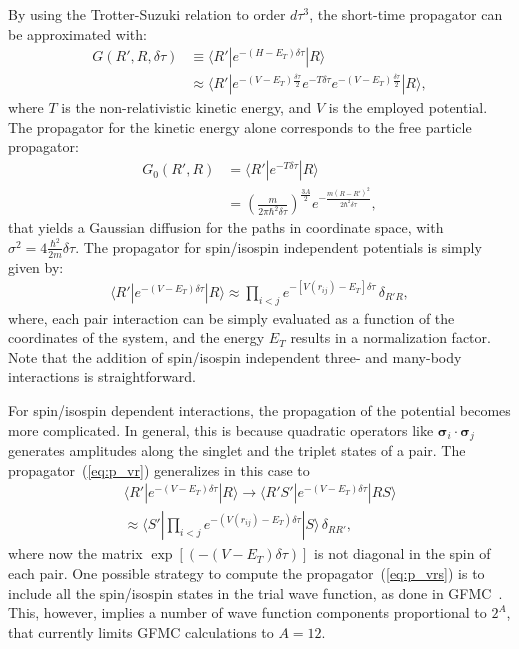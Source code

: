 \documentclass[aps,prc,twocolumn,superscriptaddress,floatfix]{revtex4-1}
\begin{document}
By using the Trotter-Suzuki relation to order $d\tau^3$,
the short-time propagator can be approximated with:
\begin{align}
G(R',R,\delta\tau)&\equiv\langle R'|e^{-(H-E_T)\delta\tau}|R\rangle \nonumber \\
&\approx \langle R'|e^{-(V-E_T)\frac{\delta\tau}{2}}e^{-T\delta\tau}e^{-(V-E_T)\frac{\delta\tau}{2}}
|R\rangle ,
\end{align}
where $T$ is the non-relativistic kinetic energy, and $V$ is the employed potential.
The propagator for the kinetic energy alone corresponds to the free particle propagator:
\begin{align} 
G_0(R',R)&=\langle R'|e^{-T\delta\tau}|R\rangle\nonumber \\
&=\left(\frac{m}{2\pi\hbar^2\delta\tau}\right)^{\frac{3A}{2}}e^{-\frac{m(R-R')^2}{2\hbar^2\delta\tau}} ,
\label{eq:g0}
\end{align}
that yields a Gaussian diffusion for the paths in coordinate space, with
$\sigma^2 = 4 \frac{\hbar^2}{2m} \delta\tau$.
The propagator for spin/isospin independent potentials is simply given by: 
\begin{align}
\langle R'|e^{-(V-E_T)\delta\tau}|R\rangle \approx
\prod_{i<j}e^{-[V(r_{ij})-E_T]\delta\tau}\,\delta_{R'R} ,
\label{eq:p_vr}
\end{align}
where, each pair interaction can be simply evaluated as a function of the coordinates of the 
system, and the energy $E_T$ results in a normalization factor. 
Note that the addition of spin/isospin independent three- and many-body interactions
is straightforward.

For spin/isospin dependent interactions, the propagation of the potential becomes more complicated.
In general, this is because quadratic operators like $\bm\sigma_i\cdot\bm\sigma_j$
generates amplitudes along the singlet and the triplet states of a pair. 
The propagator~(\ref{eq:p_vr}) generalizes in this case to
\begin{align}
\langle R'|e^{-(V-E_T)\delta\tau}|R\rangle  \rightarrow
\langle R'S'|e^{-(V-E_T)\delta\tau}|RS\rangle \nonumber \\
 \approx \langle S'|\prod_{i<j}e^{-(V(r_{ij})-E_T)\delta\tau}|S\rangle\,\delta_{RR'} ,
\label{eq:p_vrs}
\end{align}
where now the matrix $\exp[(-(V-E_T)\delta\tau)]$ is not diagonal in the spin of each pair.
One possible strategy to compute the propagator~(\ref{eq:p_vrs}) is to include all the  
spin/isospin states in the trial wave function, as done in GFMC~\cite{Carlson:2015}.  
This, however, implies a number of wave function components proportional to $2^A$, 
that currently limits GFMC calculations to $A=12$.
\end{document}
